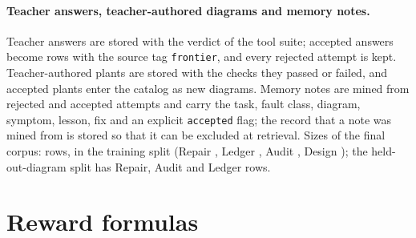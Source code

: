 \paragraph{Teacher answers, teacher-authored diagrams and memory notes.} Teacher answers are stored with the verdict of the tool suite; accepted answers become rows with the source tag \texttt{frontier}, and every rejected attempt is kept. Teacher-authored plants are stored with the checks they passed or failed, and accepted plants enter the catalog as new diagrams. Memory notes are mined from rejected and accepted attempts and carry the task, fault class, diagram, symptom, lesson, fix and an explicit \texttt{accepted} flag; the record that a note was mined from is stored so that it can be excluded at retrieval.
Sizes of the final corpus:  rows,  in the training split (Repair , Ledger , Audit , Design ); the held-out-diagram split has  Repair,  Audit and  Ledger rows.

\begin{table}[tbp]
\centering

\caption{Rows per split of the ground-truth datasets the baselines and evaluations read (seed 0: \texttt{data/processed} and the diagram catalog \texttt{data/processed\_arch}); the baselines sample at most 200 Repair, 100 Audit and 400 Ledger rows per split and 30 Design sites per held-out split, and the anytime design curves of \cref{fig:fig_design_baselines} use the first 30 sites of each of the four Design test splits (120 held-out sites, no validation sites). The training corpus has  rows. Splits for the in-distribution sets are separated by a hash of the example identifier. Data: \texttt{assets/splits.json}.}
\label{tab:datasets}
\end{table}

\section{Reward formulas}\label{app:rewards}

